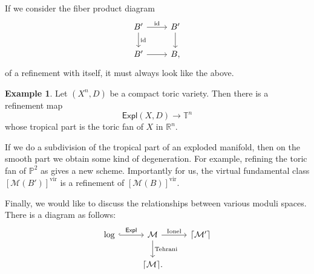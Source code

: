 \documentclass[leqno, openany]{memoir}
\DeclarePairedDelimiter{\ceil}{\lceil}{\rceil}
\theoremstyle{definition}
\newtheorem{exm}[thm]{Example}
\theoremstyle{remark}
\theoremstyle{plain}
\theoremstyle{definition}
\theoremstyle{remark}
\newcommand{\R}{\mathbb{R}}
\renewcommand{\P}{\mathbb{P}}
\newcommand{\mc}[1]{\mathcal{#1}}
\newcommand{\T}{\mathbb{T}}
\newcommand{\mr}[1]{\mathrm{#1}}
\newcommand{\ms}[1]{\mathsf{#1}}
\begin{document}
If we consider the fiber product diagram
\begin{equation*}
  \begin{tikzcd}
    B' \ar{d}{\mr{id}} \ar{r}{\mr{id}} & B' \ar{d} \\
    B' \ar{r} & B,
  \end{tikzcd}
\end{equation*}
of a refinement with itself, it must always look like the above.

\begin{exm}
  Let $(X^n, D)$ be a compact toric variety. Then there is a refinement map
  \[ \ms{Expl}(X, D) \to \T^n \]
  whose tropical part is the toric fan of $X$ in $\R^n$.
\end{exm}

If we do a subdivision of the tropical part of an exploded manifold, then on the smooth part we obtain some kind of degeneration. For example, refining the toric fan of $\P^2$ as gives a new scheme. Importantly for us, the virtual fundamental class $[\mc{M}(B')]^{\mr{vir}}$ is a refinement of $[\mc{M}(B)]^{\mr{vir}}$.

Finally, we would like to discuss the relationships between various moduli spaces. There is a diagram as follows:
\begin{equation*}
  \begin{tikzcd}
    \mr{log} \ar[hookrightarrow]{r}{\ms{Expl}} & \mc{M} \ar{d}{\text{Tehrani}} \ar{r}{\text{Ionel}} & \ceil{\mc{M}'} \\
    & \ceil{\mc{M}}.
  \end{tikzcd}
\end{equation*}
\end{document}
